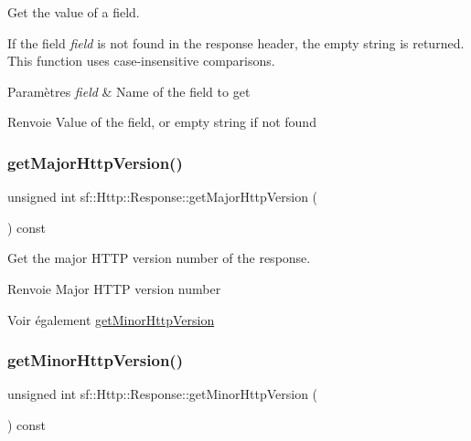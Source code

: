 Get the value of a field. 

If the field {\itshape field} is not found in the response header, the empty string is returned. This function uses case-\/insensitive comparisons.


\begin{DoxyParams}{Paramètres}
{\em field} & Name of the field to get\\
\hline
\end{DoxyParams}
\begin{DoxyReturn}{Renvoie}
Value of the field, or empty string if not found 
\end{DoxyReturn}
\mbox{\label{classsf_1_1Http_1_1Response_ab1c6948f6444fad34d0537e206e398b8}} 
\subsubsection{\texorpdfstring{get\+Major\+Http\+Version()}{getMajorHttpVersion()}}
{\footnotesize\ttfamily unsigned int sf\+::\+Http\+::\+Response\+::get\+Major\+Http\+Version (\begin{DoxyParamCaption}{ }\end{DoxyParamCaption}) const}



Get the major H\+T\+TP version number of the response. 

\begin{DoxyReturn}{Renvoie}
Major H\+T\+TP version number
\end{DoxyReturn}
\begin{DoxySeeAlso}{Voir également}
\hyperlink{classsf_1_1Http_1_1Response_af3c649568d2e291e71c3a7da546bb392}{get\+Minor\+Http\+Version} 
\end{DoxySeeAlso}
\mbox{\label{classsf_1_1Http_1_1Response_af3c649568d2e291e71c3a7da546bb392}} 
\subsubsection{\texorpdfstring{get\+Minor\+Http\+Version()}{getMinorHttpVersion()}}
{\footnotesize\ttfamily unsigned int sf\+::\+Http\+::\+Response\+::get\+Minor\+Http\+Version (\begin{DoxyParamCaption}{ }\end{DoxyParamCaption}) const}



